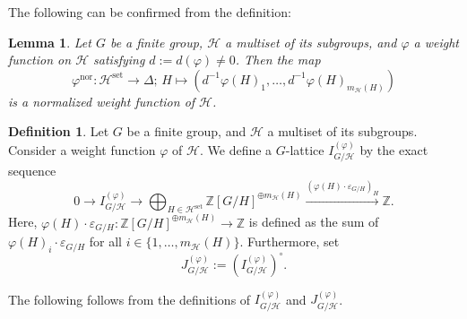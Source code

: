 \documentclass[12pt]{amsart}
\theoremstyle{plain}
\newtheorem{lem}[thm]{Lemma}
\theoremstyle{definition}
\newtheorem{dfn}[thm]{Definition}
\numberwithin{thm}{section}
\numberwithin{equation}{section}
\newcommand{\Z}{\mathbb{Z}}
\newcommand{\cH}{\mathcal{H}}
\DeclareMathOperator{\nor}{nor}
\DeclareMathOperator{\set}{set}
\begin{document}
The following can be confirmed from the definition:

\begin{lem}\label{lem:pnor}
Let $G$ be a finite group, $\cH$ a multiset of its subgroups, and $\varphi$ a weight function on $\cH$ satisfying $d:=d(\varphi)\neq 0$. Then the map
\begin{equation*}
\varphi^{\nor} \colon \cH^{\set} \rightarrow \Delta;\,H \mapsto (d^{-1}\varphi(H)_{1},\ldots,d^{-1}\varphi(H)_{m_{\cH}(H)})
\end{equation*}
is a normalized weight function of $\cH$. 
\end{lem}

\begin{dfn}\label{dfn:gnmn}
Let $G$ be a finite group, and $\cH$ a multiset of its subgroups. Consider a weight function $\varphi$ of $\cH$. We define a $G$-lattice $I_{G/\cH}^{(\varphi)}$ by the exact sequence
\begin{equation}\label{eq:ipdf}
0\rightarrow I_{G/\cH}^{(\varphi)}\rightarrow \bigoplus_{H\in \cH^{\set}}\Z[G/H]^{\oplus m_{\cH}(H)}\xrightarrow{(\varphi(H)\cdot \varepsilon_{G/H})_{H}} \Z. 
\end{equation}
Here, $\varphi(H)\cdot \varepsilon_{G/H}\colon \Z[G/H]^{\oplus m_{\cH}(H)}\rightarrow \Z$ is defined as the sum of $\varphi(H)_{i}\cdot \varepsilon_{G/H}$ for all $i\in \{1,\ldots,m_{\cH}(H)\}$. Furthermore, set 
\begin{equation*}
J_{G/\cH}^{(\varphi)}:=(I_{G/\cH}^{(\varphi)})^{\circ}. 
\end{equation*}
\end{dfn}

The following follows from the definitions of $I_{G/\cH}^{(\varphi)}$ and $J_{G/\cH}^{(\varphi)}$. 
\end{document}
